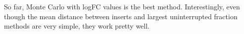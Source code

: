 \documentclass[12pt,letterpaper]{article}
\begin{document}
So far, Monte Carlo with logFC values is the best method. Interestingly, even though the mean distance between inserts and largest uninterrupted fraction methods are very simple, they work pretty well.




\end{document}

